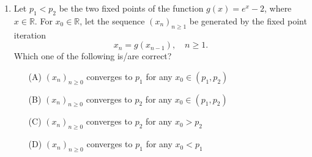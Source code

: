 \documentclass[journal]{IEEEtran}
\numberwithin{equation}{enumi}
\numberwithin{figure}{enumi}
\begin{document}
\begin{enumerate}
    \bigskip

    \item Let $p_1 < p_2$ be the two fixed points of the function $g(x) = e^x - 2$, where $x \in \mathbb{R}$. For $x_0 \in \mathbb{R}$, let the sequence $(x_n)_{n \geq 1}$ be generated by the fixed point iteration
    \[
    x_n = g(x_{n-1}), \quad n \geq 1.
    \]
    Which one of the following is/are correct?
    \begin{enumerate}
        \item[(A)] $(x_n)_{n \geq 0}$ converges to $p_1$ for any $x_0 \in (p_1, p_2)$
        \item[(B)] $(x_n)_{n \geq 0}$ converges to $p_2$ for any $x_0 \in (p_1, p_2)$
        \item[(C)] $(x_n)_{n \geq 0}$ converges to $p_2$ for any $x_0 > p_2$
        \item[(D)] $(x_n)_{n \geq 0}$ converges to $p_1$ for any $x_0 < p_1$
    \end{enumerate}
\end{enumerate}
\end{document}
